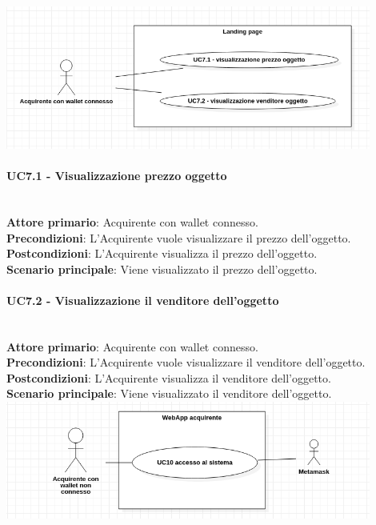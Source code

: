 \documentclass[a4paper, 12pt]{article}
\begin{document}
\includegraphics[width=0.9\textwidth]{UC7D}

\paragraph{UC7.1 - Visualizzazione prezzo oggetto}\\
\textbf{Attore primario}: Acquirente con wallet connesso.\\
\textbf{Precondizioni}: L'Acquirente vuole visualizzare il prezzo dell'oggetto.\\
\textbf{Postcondizioni}: L'Acquirente visualizza il prezzo dell'oggetto.\\
\textbf{Scenario principale}: Viene visualizzato il prezzo dell'oggetto.\\

\paragraph{UC7.2 - Visualizzazione il venditore dell'oggetto}\\
\textbf{Attore primario}: Acquirente con wallet connesso.\\
\textbf{Precondizioni}: L'Acquirente vuole visualizzare il venditore dell'oggetto.\\
\textbf{Postcondizioni}: L'Acquirente visualizza il venditore dell'oggetto.\\
\textbf{Scenario principale}: Viene visualizzato il venditore dell'oggetto.\\

\includegraphics[width=0.9\textwidth]{UC_WAA1}
\end{document}
